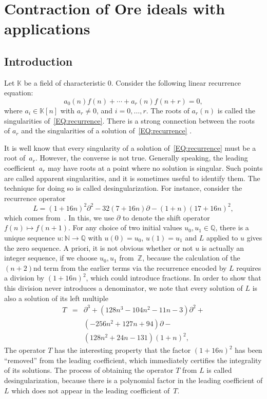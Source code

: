 \documentclass[10pt,a4paper]{article}
\newcommand{\bN}{ {\mathbb  N}}
\newcommand{\bZ} { {\mathbb Z}}
\newcommand{\bQ}{ {\mathbb  Q}}
\newcommand{\bK}{ {\mathbb  K}}
\newcommand{\pa}{ {\partial}}
\begin{document}
\section{Contraction of Ore ideals with applications} \label{SECT:contraction}

\subsection{Introduction}
Let $\bK$ be a field of characteristic $0$. 
Consider the following linear recurrence equation:
\begin{equation} \label{EQ:recurrence}
 a_0(n)f(n) + \cdots + a_r(n)f(n+r)=0,
\end{equation}
where $a_i \in \bK[n]$ with $a_r \neq 0$, and $i = 0, \ldots, r$. The roots of $a_r(n)$ is called 
the singularities of~\eqref{EQ:recurrence}.  
There is a strong connection between the roots of $a_r$ 
and the singularities of a solution of~\eqref{EQ:recurrence} . 

It is well know that every singularity of a solution of~\eqref{EQ:recurrence} 
must be a root of~$a_r$. However, the converse is not true.
Generally speaking, the leading coefficient~$a_r$ may have roots at a point where no solution is singular. 
Such points are called
apparent singularities, and it is sometimes useful to
identify them. The technique for doing so is called desingularization.
For instance, consider the recurrence operator
\[
 L = (1 + 16 n)^2 \pa^2 - 32 (7 + 16 n) \pa - (1 + n)(17 + 16 n)^2,
\]
which comes from~\cite[Section 4.1]{Abramov2006}. 
In this, we use $\pa$ to denote the shift operator $f(n) \mapsto f(n + 1)$.
For any choice of two initial values
$u_0,u_1\in  \bQ$, there is a unique sequence $u \colon
\bN \to \bQ$ with $u(0)=u_0$, $u(1)=u_1$ and $L$ applied to $u$
gives the zero sequence. A priori, it is not obvious whether or
not $u$ is actually an integer sequence, if we choose $u_0,u_1$
from~$\bZ$, because the calculation of the $(n+2)$nd term
from the earlier terms via the recurrence encoded by $L$ requires
a division by $(1+16n)^2$, which could introduce fractions. In order
to show that this division never introduces a denominator, 
we note that every solution of $L$ is also a solution
of its left multiple
\begin{equation} \label{EQ:ah}
\begin{array}{ccl}
T  & = & \pa^3 +\left(128 n^3-104 n^2-11 n-3\right) \pa^2 + \\
          &   & \left(-256 n^2+127 n + 94 \right) \pa - \\
          &   & (128 n^2+24 n-131)(1 + n)^2,
\end{array}
\end{equation}
The operator $T$ has the interesting property that the factor
$(1+16n)^2$ has been ``removed'' from the leading
coefficient, which immediately certifies the integrality of its solutions. 
The process of obtaining the operator $T$ from $L$ is called
desingularization, because there is a polynomial factor in the
leading coefficient of $L$ which does not appear in the leading
coefficient of~$T$. 
\end{document}
